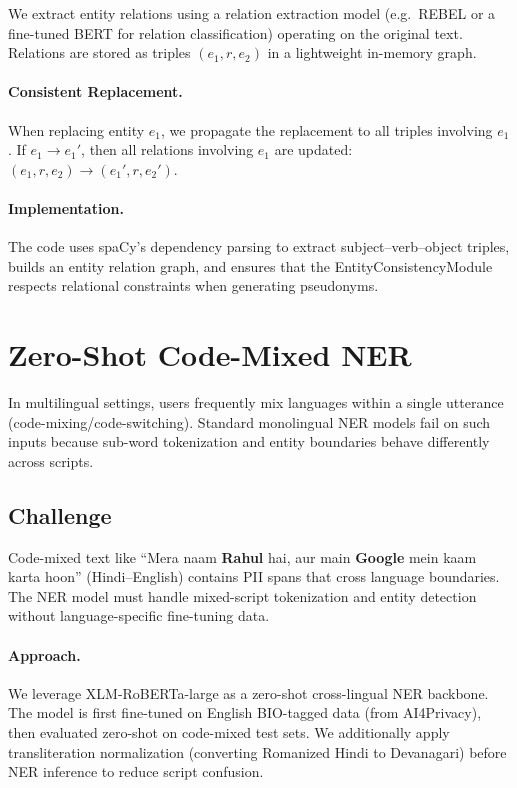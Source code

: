 \documentclass[11pt, a4paper]{article}
\begin{document}
We extract entity relations using a relation extraction model (e.g.\ REBEL or a fine-tuned BERT for relation classification) operating on the original text.  Relations are stored as triples $(e_1, r, e_2)$ in a lightweight in-memory graph.

\paragraph{Consistent Replacement.}
When replacing entity $e_1$, we propagate the replacement to all triples involving $e_1$.  If $e_1 \to e_1'$, then all relations involving $e_1$ are updated: $(e_1, r, e_2) \to (e_1', r, e_2')$.

\paragraph{Implementation.}
The code uses spaCy's dependency parsing to extract subject--verb--object triples, builds an entity relation graph, and ensures that the EntityConsistencyModule respects relational constraints when generating pseudonyms.


\section{Zero-Shot Code-Mixed NER}
\label{sec:codemixed}

In multilingual settings, users frequently mix languages within a single utterance (code-mixing/code-switching).  Standard monolingual NER models fail on such inputs because sub-word tokenization and entity boundaries behave differently across scripts.

\subsection{Challenge}

Code-mixed text like ``Mera naam \textbf{Rahul} hai, aur main \textbf{Google} mein kaam karta hoon'' (Hindi--English) contains PII spans that cross language boundaries.  The NER model must handle mixed-script tokenization and entity detection without language-specific fine-tuning data.

\paragraph{Approach.}
We leverage XLM-RoBERTa-large as a zero-shot cross-lingual NER backbone.  The model is first fine-tuned on English BIO-tagged data (from AI4Privacy), then evaluated zero-shot on code-mixed test sets.  We additionally apply transliteration normalization (converting Romanized Hindi to Devanagari) before NER inference to reduce script confusion.
\end{document}
